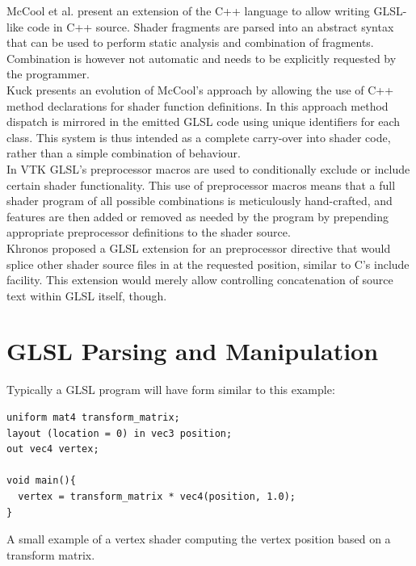 \documentclass{sig-alternate}
\begin{document}
McCool et al.\cite{mccool2002shader} present an extension of the C++ language to allow writing GLSL-like code in C++ source. Shader fragments are parsed into an abstract syntax that can be used to perform static analysis and combination of fragments. Combination is however not automatic and needs to be explicitly requested by the programmer. \\

Kuck\cite{kuck2007object} presents an evolution of McCool's approach by allowing the use of C++ method declarations for shader function definitions. In this approach method dispatch is mirrored in the emitted GLSL code using unique identifiers for each class. This system is thus intended as a complete carry-over into shader code, rather than a simple combination of behaviour. \\

In VTK\cite{vtk} GLSL's  preprocessor macros are used to conditionally exclude or include certain shader functionality. This use of preprocessor macros means that a full shader program of all possible combinations is meticulously hand-crafted, and features are then added or removed as needed by the program by prepending appropriate preprocessor definitions to the shader source. \\

Khronos proposed a GLSL extension\cite{arbinclude} for an  preprocessor directive that would splice other shader source files in at the requested position, similar to C's include facility. This extension would merely allow controlling concatenation of source text within GLSL itself, though.

\section{GLSL Parsing and Manipulation}\label{section:3}
Typically a GLSL program will have form similar to this example:

\begin{listing}[h]
\begin{verbatim}
uniform mat4 transform_matrix;
layout (location = 0) in vec3 position;
out vec4 vertex;

void main(){
  vertex = transform_matrix * vec4(position, 1.0);
}
\end{verbatim}
\caption{A small example of a vertex shader computing the vertex position based on a transform matrix.}
\label{lst:vertex}
\end{listing}
\end{document}
